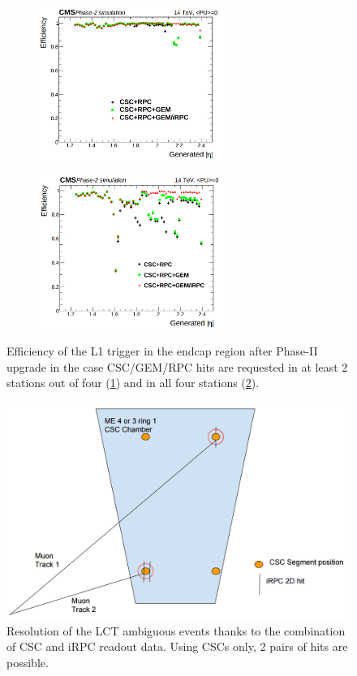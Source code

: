 	\begin{figure}[H]
		\begin{subfigure}{0.5\linewidth}
			\centering
			\includegraphics[height=5cm]{fig/chapt3/EMTF-eff-2of4.png}
			\caption{\label{fig:EMTF-eff:A}}
		\end{subfigure}
		\begin{subfigure}{0.5\linewidth}
			\centering
			\includegraphics[height=5cm]{fig/chapt3/EMTF-eff-4of4.png}
			\caption{\label{fig:EMTF-eff:B}}
		\end{subfigure}
		\caption{\label{fig:EMTF-eff} Efficiency of the L1 trigger in the endcap region after Phase-II upgrade in the case CSC/GEM/RPC hits are requested in at least 2 stations out of four (\ref{fig:EMTF-eff:A}) and in all four stations (\ref{fig:EMTF-eff:B}).}
	\end{figure}

	\begin{figure}[H]
		\centering
		\includegraphics[width=0.9\plotwidth]{fig/chapt3/CSC-LCT-ambiguity.png}
		\caption{\label{fig:LCT-ambiguity} Resolution of the LCT ambiguous events thanks to the combination of CSC and iRPC readout data. Using CSCs only, 2 pairs of hits are possible.}
	\end{figure}
	
